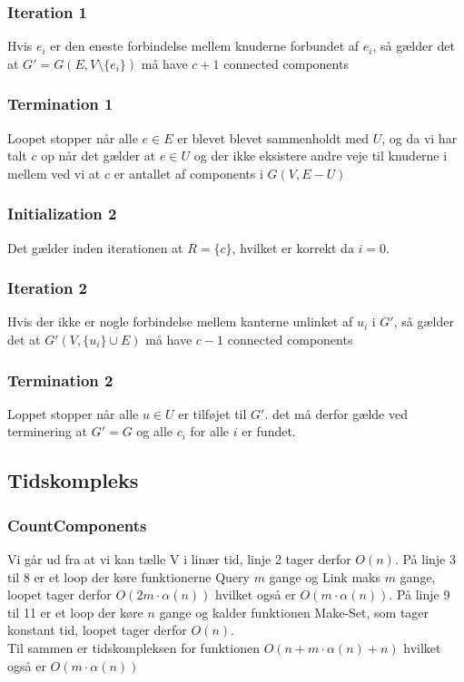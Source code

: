 \documentclass[12pt]{article}
\begin{document}
\subsubsection*{Iteration 1}
Hvis $e_i$ er den eneste forbindelse mellem knuderne forbundet af $e_i$, så gælder det at  $G' = G(E, V\setminus\{e_i\})$ må have $c+1$ connected components 
\subsubsection*{Termination 1}
Loopet stopper når alle $e\in E$ er blevet blevet sammenholdt med $U$, og da vi har talt $c$ op når det gælder at $e\in U$ og der ikke eksistere andre veje til knuderne i mellem ved vi at $c$ er antallet af components i $G(V, E-U)$
\subsubsection*{Initialization 2}
Det gælder inden iterationen at $R=\{c\}$, hvilket er korrekt da $i=0$.
\subsubsection*{Iteration 2}
Hvis der ikke er nogle forbindelse mellem kanterne unlinket af $u_i$ i $G'$, så gælder det at $G'(V, \{u_i\}\cup E)$ må have $c-1$ connected components
\subsubsection*{Termination 2}
Loppet stopper når alle $u\in U$ er tilføjet til $G'$. det må derfor gælde ved terminering at $G'=G$ og alle $c_i$ for alle $i$ er fundet.
\subsection*{Tidskompleks}
\subsubsection*{CountComponents}
Vi går ud fra at vi kan tælle V i linær tid, linje 2 tager derfor $O(n)$. På linje 3 til 8 er et loop der køre funktionerne Query $m$ gange og Link maks $m$ gange, loopet tager derfor $O(2m\cdot\alpha(n))$ hvilket også er $O(m\cdot\alpha(n))$. På linje 9 til 11 er et loop der køre $n$ gange og kalder funktionen Make-Set, som tager konstant tid, loopet tager derfor $O(n)$.\\
Til sammen er tidskompleksen for funktionen $O(n+m\cdot\alpha(n)+n)$ hvilket også er $O(m\cdot\alpha(n))$
\end{document}
